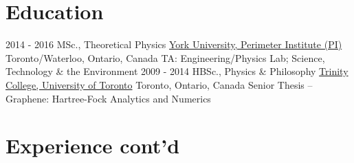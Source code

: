 \documentclass[letterpaper]{twentysecondcv} %
\begin{document}
\newpage
{}

\section{Education}

\begin{twenty} %
	\twentyitem
    	{2014 - 2016}
        {MSc., Theoretical Physics}
        {\href{http://www.yorku.ca/}{York University, Perimeter Institute (PI)}}
        {Toronto/Waterloo, Ontario, Canada}
        {}
        {TA: Engineering/Physics Lab; Science, Technology \& the Environment}
	\twentyitem
    	{2009 - 2014}
        {HBSc., Physics \& Philosophy}
        {\href{https://www.utoronto.ca/}{Trinity College, University of Toronto}}
        {Toronto, Ontario, Canada}
        {}
        {Senior Thesis -- Graphene: Hartree-Fock Analytics and Numerics}
\end{twenty}

\vfill

\section{Experience cont'd}
\end{document}
